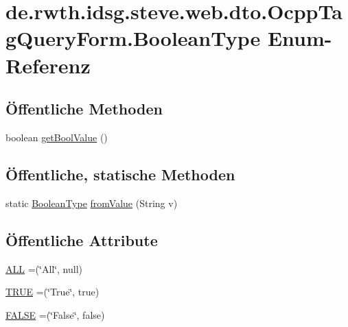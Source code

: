 \hypertarget{enumde_1_1rwth_1_1idsg_1_1steve_1_1web_1_1dto_1_1_ocpp_tag_query_form_1_1_boolean_type}{\section{de.\+rwth.\+idsg.\+steve.\+web.\+dto.\+Ocpp\+Tag\+Query\+Form.\+Boolean\+Type Enum-\/\+Referenz}
\label{enumde_1_1rwth_1_1idsg_1_1steve_1_1web_1_1dto_1_1_ocpp_tag_query_form_1_1_boolean_type}
}
\subsection*{Öffentliche Methoden}
\begin{DoxyCompactItemize}
\item 
boolean \hyperlink{enumde_1_1rwth_1_1idsg_1_1steve_1_1web_1_1dto_1_1_ocpp_tag_query_form_1_1_boolean_type_a91f2fc20c93733d8e2420adc679cc4fa}{get\+Bool\+Value} ()
\end{DoxyCompactItemize}
\subsection*{Öffentliche, statische Methoden}
\begin{DoxyCompactItemize}
\item 
static \hyperlink{enumde_1_1rwth_1_1idsg_1_1steve_1_1web_1_1dto_1_1_ocpp_tag_query_form_1_1_boolean_type}{Boolean\+Type} \hyperlink{enumde_1_1rwth_1_1idsg_1_1steve_1_1web_1_1dto_1_1_ocpp_tag_query_form_1_1_boolean_type_a955c7d858d69f94a9c4a9dc94a62201c}{from\+Value} (String v)
\end{DoxyCompactItemize}
\subsection*{Öffentliche Attribute}
\begin{DoxyCompactItemize}
\item 
\hyperlink{enumde_1_1rwth_1_1idsg_1_1steve_1_1web_1_1dto_1_1_ocpp_tag_query_form_1_1_boolean_type_aaaf30107196a18dde3ebad7bf1a225ac}{A\+L\+L} =(\char`\"{}All\char`\"{}, null)
\item 
\hyperlink{enumde_1_1rwth_1_1idsg_1_1steve_1_1web_1_1dto_1_1_ocpp_tag_query_form_1_1_boolean_type_a1d0cd8f80e6dde69f326cf62cd84fece}{T\+R\+U\+E} =(\char`\"{}True\char`\"{}, true)
\item 
\hyperlink{enumde_1_1rwth_1_1idsg_1_1steve_1_1web_1_1dto_1_1_ocpp_tag_query_form_1_1_boolean_type_a75c90c893de3bf25a7d3c5e831e02497}{F\+A\+L\+S\+E} =(\char`\"{}False\char`\"{}, false)
\end{DoxyCompactItemize}



